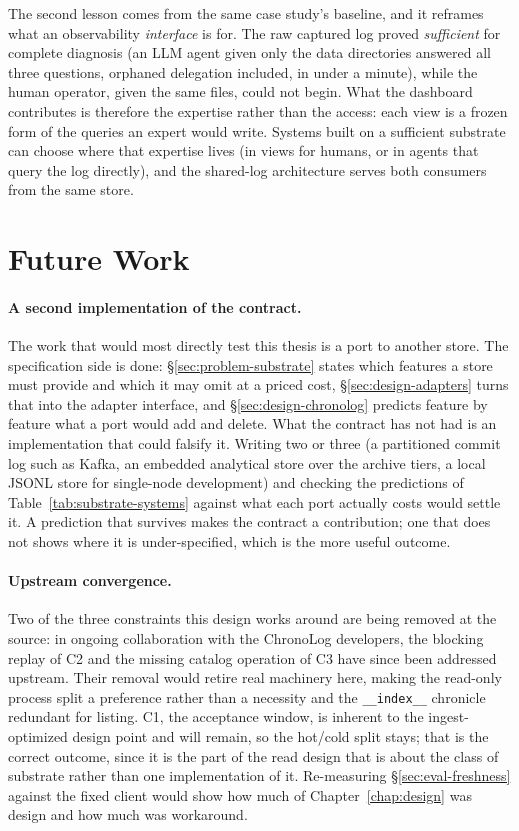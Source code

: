 The second lesson comes from the same case study's baseline, and it
reframes what an observability \emph{interface} is for. The raw
captured log proved \emph{sufficient} for complete diagnosis (an
LLM agent given only the data directories answered all three
questions, orphaned delegation included, in under a minute), while
the human operator, given the same files, could not begin. What the
dashboard contributes is therefore the expertise rather than the access:
each view is a frozen form of the queries an
expert would write. Systems built on a sufficient substrate can choose
where that expertise lives (in views for humans, or in agents that
query the log directly), and the shared-log architecture serves both
consumers from the same store.

\section{Future Work}
\label{sec:future}

\paragraph{A second implementation of the contract.} The work that would
most directly test this thesis is a port to another store. The
specification side is done: \S\ref{sec:problem-substrate} states which
features a store must provide and which it may omit at a priced cost,
\S\ref{sec:design-adapters} turns that into the adapter interface, and
\S\ref{sec:design-chronolog} predicts feature by feature what a port would
add and delete. What the contract has not had is an implementation that
could falsify it. Writing two or three (a partitioned commit log such as
Kafka, an embedded analytical store over the archive tiers, a local JSONL
store for single-node development) and checking the predictions of
Table~\ref{tab:substrate-systems} against what each port actually costs
would settle it. A prediction that survives makes the contract a
contribution; one that does not shows where it is under-specified, which is
the more useful outcome.

\paragraph{Upstream convergence.} Two of the three constraints this design
works around are being removed at the source: in ongoing collaboration with
the ChronoLog developers, the blocking replay of C2 and the missing catalog
operation of C3 have since been addressed upstream. Their removal would
retire real machinery here, making the read-only process split a preference
rather than a necessity and the \texttt{\_\_index\_\_} chronicle redundant
for listing. C1, the acceptance window, is inherent to the ingest-optimized
design point and will remain, so the hot/cold split stays; that is the
correct outcome, since it is the part of the read design that is about the
class of substrate rather than one implementation of it. Re-measuring
\S\ref{sec:eval-freshness} against the fixed client would show how much of
Chapter~\ref{chap:design} was design and how much was workaround.

